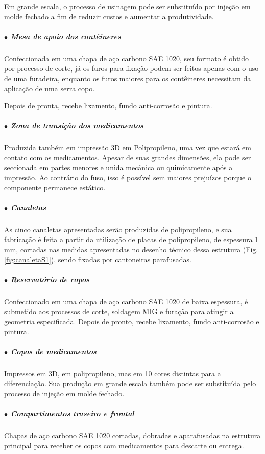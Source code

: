 Em grande escala, o processo de usinagem pode ser substituído por injeção em molde fechado a fim de reduzir custos e aumentar a produtividade.

\subparagraph*{$\bullet$ Mesa de apoio dos contêineres} \hfill

Confeccionada em uma chapa de aço carbono SAE 1020, seu formato é obtido por processo de corte, já os furos para fixação podem ser feitos apenas com o uso de uma furadeira, enquanto os furos maiores para os contêineres necessitam da aplicação de uma serra copo.

Depois de pronta, recebe lixamento, fundo anti-corrosão e pintura.

\subparagraph*{$\bullet$ Zona de transição dos medicamentos} \hfill

Produzida também em impressão 3D em Polipropileno, uma vez que estará em contato com os medicamentos. Apesar de suas grandes dimensões, ela pode ser seccionada em partes menores e unida mecânica ou quimicamente após a impressão. Ao contrário do fuso, isso é possível sem maiores prejuízos porque o componente permanece estático.

\subparagraph*{$\bullet$ Canaletas} \hfill

As cinco canaletas apresentadas serão produzidas de polipropileno, e sua fabricação é feita a partir da utilização de placas de polipropileno, de espessura 1 mm, cortadas nas medidas apresentadas no desenho técnico dessa estrutura (Fig. \ref{fig:canaletaS1}), sendo fixadas por cantoneiras parafusadas.

\subparagraph*{$\bullet$ Reservatório de copos} \hfill

Confeccionado em uma chapa de aço carbono SAE 1020 de baixa espessura, é submetido aos processos de corte, soldagem MIG e furação para atingir a geometria especificada. Depois de pronto, recebe lixamento, fundo anti-corrosão e pintura.

\subparagraph*{$\bullet$ Copos de medicamentos} \hfill

Impressos em 3D, em polipropileno, mas em 10 cores distintas para a diferenciação. Sua produção em grande escala também pode ser substituída pelo processo de injeção em molde fechado. 

\subparagraph*{$\bullet$ Compartimentos traseiro e frontal} \hfill 

Chapas de aço carbono SAE 1020 cortadas, dobradas e aparafusadas na estrutura principal para receber os copos com medicamentos para descarte ou entrega.

